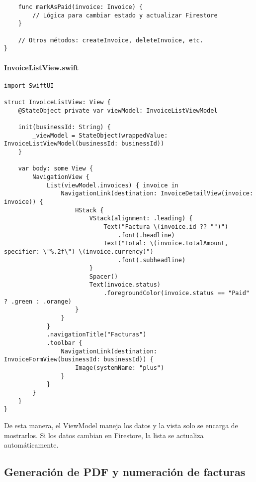 \begin{large}
\begin{verbatim}
    func markAsPaid(invoice: Invoice) {
        // Lógica para cambiar estado y actualizar Firestore
    }

    // Otros métodos: createInvoice, deleteInvoice, etc.
}
\end{verbatim}

\paragraph{InvoiceListView.swift}
\begin{verbatim}
import SwiftUI

struct InvoiceListView: View {
    @StateObject private var viewModel: InvoiceListViewModel

    init(businessId: String) {
        _viewModel = StateObject(wrappedValue: InvoiceListViewModel(businessId: businessId))
    }

    var body: some View {
        NavigationView {
            List(viewModel.invoices) { invoice in
                NavigationLink(destination: InvoiceDetailView(invoice: invoice)) {
                    HStack {
                        VStack(alignment: .leading) {
                            Text("Factura \(invoice.id ?? "")")
                                .font(.headline)
                            Text("Total: \(invoice.totalAmount, specifier: \"%.2f\") \(invoice.currency)")
                                .font(.subheadline)
                        }
                        Spacer()
                        Text(invoice.status)
                            .foregroundColor(invoice.status == "Paid" ? .green : .orange)
                    }
                }
            }
            .navigationTitle("Facturas")
            .toolbar {
                NavigationLink(destination: InvoiceFormView(businessId: businessId)) {
                    Image(systemName: "plus")
                }
            }
        }
    }
}
\end{verbatim}

De esta manera, el ViewModel maneja los datos y la vista solo se encarga de mostrarlos. Si los datos cambian en Firestore, la lista se actualiza automáticamente.

\end{large}

\subsection{Generación de PDF y numeración de facturas}

